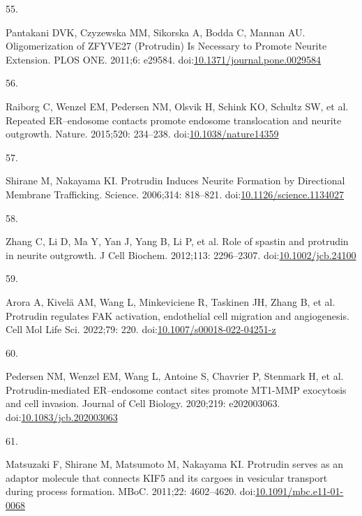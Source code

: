 \documentclass[
  12pt,
  a4paper,
]{book}
\newlength{\cslhangindent}
\newlength{\csllabelwidth}
\newlength{\cslentryspacingunit} %
\newenvironment{CSLReferences}[2] %
 {%
  \setlength{\parindent}{0pt}
  \ifodd #1
  \let\oldpar\par
  \def\par{\hangindent=\cslhangindent\oldpar}
  \fi
  \setlength{\parskip}{#2\cslentryspacingunit}
 }%
 {}
\newcommand{\CSLLeftMargin}[1]{\parbox[t]{\csllabelwidth}{#1}}
\newcommand{\CSLRightInline}[1]{\parbox[t]{\linewidth - \csllabelwidth}{#1}\break}
\begin{document}
\begin{CSLReferences}{0}{0}
\leavevmode{}%
\CSLLeftMargin{55. }%
\CSLRightInline{Pantakani DVK, Czyzewska MM, Sikorska A, Bodda C, Mannan AU. Oligomerization of {ZFYVE27} ({Protrudin}) {Is Necessary} to {Promote Neurite Extension}. PLOS ONE. 2011;6: e29584. doi:\href{https://doi.org/10.1371/journal.pone.0029584}{10.1371/journal.pone.0029584}}

\leavevmode{}%
\CSLLeftMargin{56. }%
\CSLRightInline{Raiborg C, Wenzel EM, Pedersen NM, Olsvik H, Schink KO, Schultz SW, et al. Repeated {ER}--endosome contacts promote endosome translocation and neurite outgrowth. Nature. 2015;520: 234--238. doi:\href{https://doi.org/10.1038/nature14359}{10.1038/nature14359}}

\leavevmode{}%
\CSLLeftMargin{57. }%
\CSLRightInline{Shirane M, Nakayama KI. Protrudin {Induces Neurite Formation} by {Directional Membrane Trafficking}. Science. 2006;314: 818--821. doi:\href{https://doi.org/10.1126/science.1134027}{10.1126/science.1134027}}

\leavevmode{}%
\CSLLeftMargin{58. }%
\CSLRightInline{Zhang C, Li D, Ma Y, Yan J, Yang B, Li P, et al. Role of spastin and protrudin in neurite outgrowth. J Cell Biochem. 2012;113: 2296--2307. doi:\href{https://doi.org/10.1002/jcb.24100}{10.1002/jcb.24100}}

\leavevmode{}%
\CSLLeftMargin{59. }%
\CSLRightInline{Arora A, Kivelä AM, Wang L, Minkeviciene R, Taskinen JH, Zhang B, et al. Protrudin regulates {FAK} activation, endothelial cell migration and angiogenesis. Cell Mol Life Sci. 2022;79: 220. doi:\href{https://doi.org/10.1007/s00018-022-04251-z}{10.1007/s00018-022-04251-z}}

\leavevmode{}%
\CSLLeftMargin{60. }%
\CSLRightInline{Pedersen NM, Wenzel EM, Wang L, Antoine S, Chavrier P, Stenmark H, et al. Protrudin-mediated {ER}--endosome contact sites promote {MT1-MMP} exocytosis and cell invasion. Journal of Cell Biology. 2020;219: e202003063. doi:\href{https://doi.org/10.1083/jcb.202003063}{10.1083/jcb.202003063}}

\leavevmode{}%
\CSLLeftMargin{61. }%
\CSLRightInline{Matsuzaki F, Shirane M, Matsumoto M, Nakayama KI. Protrudin serves as an adaptor molecule that connects {KIF5} and its cargoes in vesicular transport during process formation. MBoC. 2011;22: 4602--4620. doi:\href{https://doi.org/10.1091/mbc.e11-01-0068}{10.1091/mbc.e11-01-0068}}


\end{CSLReferences}
\end{document}
